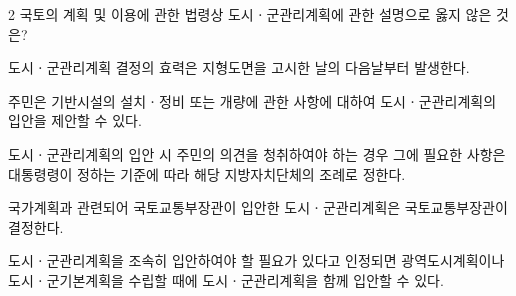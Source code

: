 \begin{question}{2}
국토의 계획 및 이용에 관한 법령상 도시ㆍ군관리계획에 관한 설명으로 옳지 않은 것은?
\begin{choices}
  \item 도시ㆍ군관리계획 결정의 효력은 지형도면을 고시한 날의 다음날부터 발생한다.
  \item 주민은 기반시설의 설치ㆍ정비 또는 개량에 관한 사항에 대하여 도시ㆍ군관리계획의 입안을 제안할 수 있다.
  \item 도시ㆍ군관리계획의 입안 시 주민의 의견을 청취하여야 하는 경우 그에 필요한 사항은 대통령령이 정하는 기준에 따라 해당 지방자치단체의 조례로 정한다.
  \item 국가계획과 관련되어 국토교통부장관이 입안한 도시ㆍ군관리계획은 국토교통부장관이 결정한다.
  \item 도시ㆍ군관리계획을 조속히 입안하여야 할 필요가 있다고 인정되면 광역도시계획이나 도시ㆍ군기본계획을 수립할 때에 도시ㆍ군관리계획을 함께 입안할 수 있다.
\end{choices}
\end{question}
